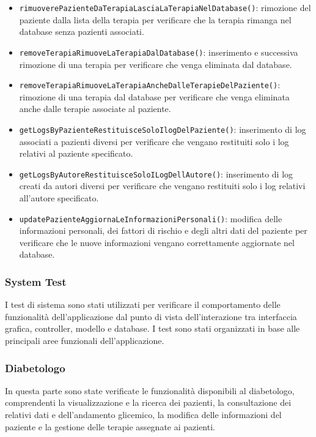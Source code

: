 \begin{itemize}
	\item \texttt{rimuoverePazienteDaTerapiaLasciaLaTerapiaNelDatabase()}: rimozione del paziente dalla lista della terapia per verificare che la terapia rimanga nel database senza pazienti associati.
	
	\item \texttt{removeTerapiaRimuoveLaTerapiaDalDatabase()}: inserimento e successiva rimozione di una terapia per verificare che venga eliminata dal database.
	
	\item \texttt{removeTerapiaRimuoveLaTerapiaAncheDalleTerapieDelPaziente()}: rimozione di una terapia dal database per verificare che venga eliminata anche dalle terapie associate al paziente.
	
	\item \texttt{getLogsByPazienteRestituisceSoloIlogDelPaziente()}: inserimento di log associati a pazienti diversi per verificare che vengano restituiti solo i log relativi al paziente specificato.
	
	\item \texttt{getLogsByAutoreRestituisceSoloILogDellAutore()}: inserimento di log creati da autori diversi per verificare che vengano restituiti solo i log relativi all'autore specificato.
	
	\item \texttt{updatePazienteAggiornaLeInformazioniPersonali()}: modifica delle informazioni personali, dei fattori di rischio e degli altri dati del paziente per verificare che le nuove informazioni vengano correttamente aggiornate nel database.
	
\end{itemize}

\subsubsection{System Test}

I test di sistema sono stati utilizzati per verificare il comportamento delle funzionalità dell'applicazione dal punto di vista dell'interazione tra interfaccia grafica, controller, modello e database. I test sono stati organizzati in base alle principali aree funzionali dell'applicazione.

\subsubsection*{Diabetologo}

In questa parte sono state verificate le funzionalità disponibili al diabetologo, comprendenti la visualizzazione e la ricerca dei pazienti, la consultazione dei relativi dati e dell'andamento glicemico, la modifica delle informazioni del paziente e la gestione delle terapie assegnate ai pazienti.

